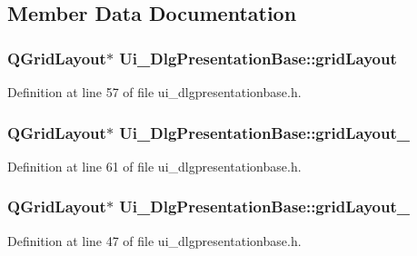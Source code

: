\subsection{Member Data Documentation}
\hypertarget{classUi__DlgPresentationBase_a74c4ca17d50a0795a123c7704a3ff96f}{
\subsubsection[{grid\+Layout}]{\setlength{\rightskip}{0pt plus 5cm}Q\+Grid\+Layout$\ast$ Ui\+\_\+\+Dlg\+Presentation\+Base\+::grid\+Layout}}\label{classUi__DlgPresentationBase_a74c4ca17d50a0795a123c7704a3ff96f}


Definition at line 57 of file ui\+\_\+dlgpresentationbase.\+h.

\hypertarget{classUi__DlgPresentationBase_afd1124df0a1ac1b6546fa5357a44c8fd}{
\subsubsection[{grid\+Layout\+\_\+2}]{\setlength{\rightskip}{0pt plus 5cm}Q\+Grid\+Layout$\ast$ Ui\+\_\+\+Dlg\+Presentation\+Base\+::grid\+Layout\+\_}}\label{classUi__DlgPresentationBase_afd1124df0a1ac1b6546fa5357a44c8fd}


Definition at line 61 of file ui\+\_\+dlgpresentationbase.\+h.

\hypertarget{classUi__DlgPresentationBase_a0c291abc35eac2e0497a5c2f1187f8cc}{
\subsubsection[{grid\+Layout\+\_\+3}]{\setlength{\rightskip}{0pt plus 5cm}Q\+Grid\+Layout$\ast$ Ui\+\_\+\+Dlg\+Presentation\+Base\+::grid\+Layout\+\_}}\label{classUi__DlgPresentationBase_a0c291abc35eac2e0497a5c2f1187f8cc}


Definition at line 47 of file ui\+\_\+dlgpresentationbase.\+h.

